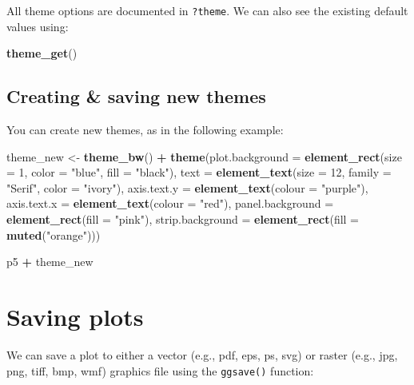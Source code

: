 \documentclass[]{book}
\newenvironment{Shaded}{\begin{snugshade}}{\end{snugshade}}
\newcommand{\KeywordTok}[1]{\textcolor[rgb]{0.13,0.29,0.53}{\textbf{#1}}}
\newcommand{\DataTypeTok}[1]{\textcolor[rgb]{0.13,0.29,0.53}{#1}}
\newcommand{\DecValTok}[1]{\textcolor[rgb]{0.00,0.00,0.81}{#1}}
\newcommand{\StringTok}[1]{\textcolor[rgb]{0.31,0.60,0.02}{#1}}
\newcommand{\OperatorTok}[1]{\textcolor[rgb]{0.81,0.36,0.00}{\textbf{#1}}}
\newcommand{\NormalTok}[1]{#1}
\begin{document}
All theme options are documented in \texttt{?theme}. We can also see the
existing default values using:

\begin{Shaded}
\begin{Highlighting}[]
\KeywordTok{theme_get}\NormalTok{()}
\end{Highlighting}
\end{Shaded}

\subsection{Creating \& saving new
themes}\label{creating-saving-new-themes}

You can create new themes, as in the following example:

\begin{Shaded}
\begin{Highlighting}[]
\NormalTok{theme_new <-}\StringTok{ }\KeywordTok{theme_bw}\NormalTok{() }\OperatorTok{+}
\StringTok{  }\KeywordTok{theme}\NormalTok{(}\DataTypeTok{plot.background =} \KeywordTok{element_rect}\NormalTok{(}\DataTypeTok{size =} \DecValTok{1}\NormalTok{, }\DataTypeTok{color =} \StringTok{"blue"}\NormalTok{, }\DataTypeTok{fill =} \StringTok{"black"}\NormalTok{),}
        \DataTypeTok{text =} \KeywordTok{element_text}\NormalTok{(}\DataTypeTok{size =} \DecValTok{12}\NormalTok{, }\DataTypeTok{family =} \StringTok{"Serif"}\NormalTok{, }\DataTypeTok{color =} \StringTok{"ivory"}\NormalTok{),}
        \DataTypeTok{axis.text.y =} \KeywordTok{element_text}\NormalTok{(}\DataTypeTok{colour =} \StringTok{"purple"}\NormalTok{),}
        \DataTypeTok{axis.text.x =} \KeywordTok{element_text}\NormalTok{(}\DataTypeTok{colour =} \StringTok{"red"}\NormalTok{),}
        \DataTypeTok{panel.background =} \KeywordTok{element_rect}\NormalTok{(}\DataTypeTok{fill =} \StringTok{"pink"}\NormalTok{),}
        \DataTypeTok{strip.background =} \KeywordTok{element_rect}\NormalTok{(}\DataTypeTok{fill =} \KeywordTok{muted}\NormalTok{(}\StringTok{"orange"}\NormalTok{)))}

\NormalTok{p5 }\OperatorTok{+}\StringTok{ }\NormalTok{theme_new}
\end{Highlighting}
\end{Shaded}

\section{Saving plots}\label{saving-plots}

We can save a plot to either a vector (e.g., pdf, eps, ps, svg) or
raster (e.g., jpg, png, tiff, bmp, wmf) graphics file using the
\texttt{ggsave()} function:
\end{document}
